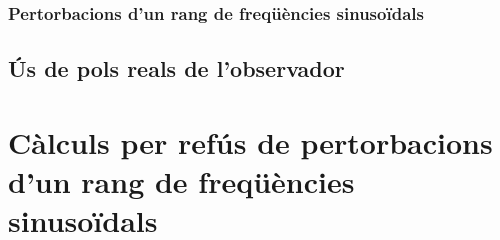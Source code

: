 \documentclass[12pt,a4paper,final,twoside,openright]{report}
\begin{document}
\subsection{Pertorbacions d'un rang de freqüències sinusoïdals}
\label{sec:pert_rang_sin}

\section{Ús de pols reals de l'observador}

%


\appendix
\clearpage %
\addappheadtotoc
\appendixpage

\chapter{Càlculs per refús de pertorbacions d'un rang de freqüències sinusoïdals}
\end{document}
